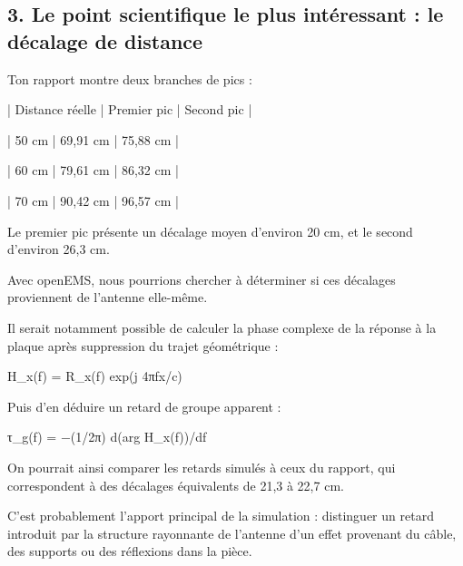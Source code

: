\documentclass[11pt,a4paper]{article}
\begin{document}
\subsection*{3. Le point scientifique le plus intéressant : le décalage de distance}
\par\medskip
Ton rapport montre deux branches de pics :\par
\par\medskip
| Distance réelle | Premier pic | Second pic |\par
| 50 cm | 69,91 cm | 75,88 cm |\par
| 60 cm | 79,61 cm | 86,32 cm |\par
| 70 cm | 90,42 cm | 96,57 cm |\par
\par\medskip
Le premier pic présente un décalage moyen d'environ 20 cm, et le second d'environ 26,3 cm.\par
\par\medskip
Avec openEMS, nous pourrions chercher à déterminer si ces décalages proviennent de l'antenne elle-même.\par
\par\medskip
Il serait notamment possible de calculer la phase complexe de la réponse à la plaque après suppression du trajet géométrique :\par
\par\medskip
H\_x(f) = R\_x(f) exp(j 4πfx/c)\par
\par\medskip
Puis d'en déduire un retard de groupe apparent :\par
\par\medskip
τ\_g(f) = −(1/2π) d(arg H\_x(f))/df\par
\par\medskip
On pourrait ainsi comparer les retards simulés à ceux du rapport, qui correspondent à des décalages équivalents de 21,3 à 22,7 cm.\par
\par\medskip
C'est probablement l'apport principal de la simulation : distinguer un retard introduit par la structure rayonnante de l'antenne d'un effet provenant du câble, des supports ou des réflexions dans la pièce.\par
\par\medskip
\end{document}
